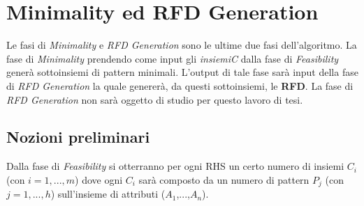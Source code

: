 \section{Minimality ed RFD Generation}
Le fasi di \emph{Minimality} e \emph{RFD Generation} sono le ultime due fasi dell'algoritmo. La fase di \emph{Minimality} prendendo come input gli \emph{insiemiC} dalla fase di \emph{Feasibility} generà sottoinsiemi di pattern minimali. L'output di tale fase sarà input della fase di \emph{RFD Generation} la quale genererà, da questi sottoinsiemi, le \textbf{RFD}. La fase di \emph{RFD Generation} non sarà oggetto di studio per questo lavoro di tesi.
\subsection{Nozioni preliminari}
Dalla fase di \emph{Feasibility} si otterranno per ogni RHS un certo numero di insiemi $C_i$ (con $i=1,...,m$) dove ogni $C_i$ sarà composto da un numero di pattern $P_j$ (con $j=1,...,h$) sull'insieme di attributi ($A_1$,...,$A_n$).
